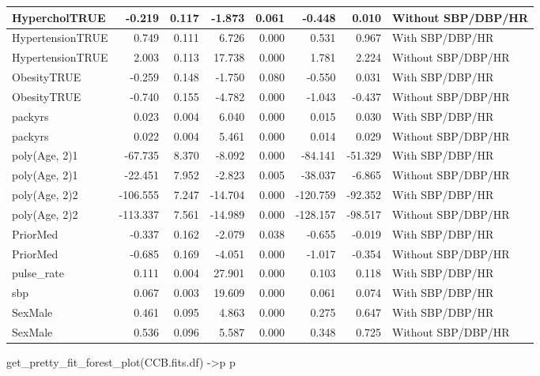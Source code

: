 \documentclass[
]{article}
\newenvironment{Shaded}{\begin{snugshade}}{\end{snugshade}}
\newcommand{\FunctionTok}[1]{\textcolor[rgb]{0.00,0.00,0.00}{#1}}
\newcommand{\NormalTok}[1]{#1}
\newcommand{\OtherTok}[1]{\textcolor[rgb]{0.56,0.35,0.01}{#1}}
\begin{document}
\begin{table}
\begin{tabular}[t]{l|r|r|r|r|r|r|l}
\hline
HypercholTRUE & -0.219 & 0.117 & -1.873 & 0.061 & -0.448 & 0.010 & Without SBP/DBP/HR\\
\hline
HypertensionTRUE & 0.749 & 0.111 & 6.726 & 0.000 & 0.531 & 0.967 & With SBP/DBP/HR\\
\hline
HypertensionTRUE & 2.003 & 0.113 & 17.738 & 0.000 & 1.781 & 2.224 & Without SBP/DBP/HR\\
\hline
ObesityTRUE & -0.259 & 0.148 & -1.750 & 0.080 & -0.550 & 0.031 & With SBP/DBP/HR\\
\hline
ObesityTRUE & -0.740 & 0.155 & -4.782 & 0.000 & -1.043 & -0.437 & Without SBP/DBP/HR\\
\hline
packyrs & 0.023 & 0.004 & 6.040 & 0.000 & 0.015 & 0.030 & With SBP/DBP/HR\\
\hline
packyrs & 0.022 & 0.004 & 5.461 & 0.000 & 0.014 & 0.029 & Without SBP/DBP/HR\\
\hline
poly(Age, 2)1 & -67.735 & 8.370 & -8.092 & 0.000 & -84.141 & -51.329 & With SBP/DBP/HR\\
\hline
poly(Age, 2)1 & -22.451 & 7.952 & -2.823 & 0.005 & -38.037 & -6.865 & Without SBP/DBP/HR\\
\hline
poly(Age, 2)2 & -106.555 & 7.247 & -14.704 & 0.000 & -120.759 & -92.352 & With SBP/DBP/HR\\
\hline
poly(Age, 2)2 & -113.337 & 7.561 & -14.989 & 0.000 & -128.157 & -98.517 & Without SBP/DBP/HR\\
\hline
PriorMed & -0.337 & 0.162 & -2.079 & 0.038 & -0.655 & -0.019 & With SBP/DBP/HR\\
\hline
PriorMed & -0.685 & 0.169 & -4.051 & 0.000 & -1.017 & -0.354 & Without SBP/DBP/HR\\
\hline
pulse\_rate & 0.111 & 0.004 & 27.901 & 0.000 & 0.103 & 0.118 & With SBP/DBP/HR\\
\hline
sbp & 0.067 & 0.003 & 19.609 & 0.000 & 0.061 & 0.074 & With SBP/DBP/HR\\
\hline
SexMale & 0.461 & 0.095 & 4.863 & 0.000 & 0.275 & 0.647 & With SBP/DBP/HR\\
\hline
SexMale & 0.536 & 0.096 & 5.587 & 0.000 & 0.348 & 0.725 & Without SBP/DBP/HR\\
\hline
\end{tabular}
\end{table}

\begin{Shaded}
\begin{Highlighting}[]
\FunctionTok{get\_pretty\_fit\_forest\_plot}\NormalTok{(CCB.fits.df) }\OtherTok{{-}\textgreater{}}\NormalTok{p}
\NormalTok{p}
\end{Highlighting}
\end{Shaded}
\end{document}
